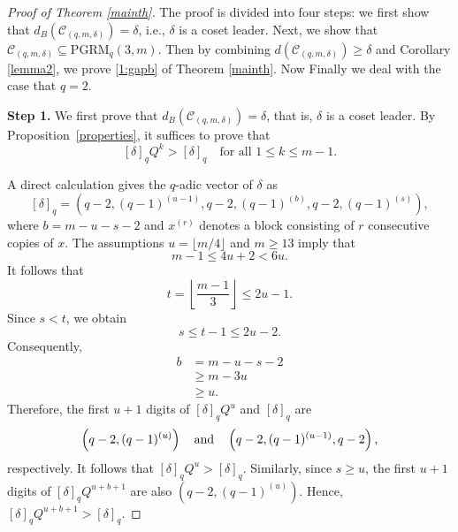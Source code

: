 \documentclass[journal,onecolumn]{IEEEtran}
\begin{document}
\begin{proof}[Proof of Theorem \ref{mainth}]
The proof is divided into four steps: we first show that $d_B(\mathcal{C}_{(q,m,\delta)})=\delta$, i.e., $\delta$ is a coset leader. Next, we show that $\mathcal{C}_{(q,m,\delta)} \subseteq
\mathrm{PGRM}_q(3,m)$. Then by combining $d(\mathcal{C}_{(q,m,\delta)}) \ge \delta$ and Corollary \ref{lemma2}, we prove \eqref{1:gapb} of Theorem \ref{mainth}. Now Finally we deal with the case that $q=2$. 

{\bf Step 1.} We first prove that $d_B(\mathcal{C}_{(q,m,\delta)})=\delta$, that is, $\delta$ is a coset leader.  
By Proposition~\ref{properties}, it suffices to prove that
\begin{equation}\label{suf}
[\delta]_qQ^k>[\delta]_q
\quad\text{for all }1\leq k\leq m-1.
\end{equation}

A direct calculation
gives the $q$-adic vector of $\delta$ as 
\begin{equation}\label{deltaq}
    [\delta]_q = \left( q-2, (q-1)^{(u-1)}, q-2, (q-1)^{(b)}, q-2, (q-1)^{(s)} \right),
\end{equation}
where $b = m - u - s - 2$ and $x^{(r)}$ denotes a block consisting of $r$ consecutive copies of
$x$.
The assumptions $u = \lfloor m/4 \rfloor$ and $m \ge 13$ imply that
\begin{equation*}
    m - 1 \le 4u + 2 < 6u.
\end{equation*}
It follows that
\begin{equation*}
    t = \left\lfloor \frac{m-1}{3} \right\rfloor \le 2u - 1.
\end{equation*}
Since $s < t$, we obtain
\begin{equation}\label{hao}
    s \le t - 1 \le 2u - 2.
\end{equation}
Consequently,
\begin{equation}\label{bgequ}
\begin{split}
    b &= m - u - s - 2 \\
    &\ge m - 3u\\ 
    &\ge u.
    \end{split}
\end{equation} 
Therefore, the first $u+1$ digits of $[\delta]_qQ^u$ and $[\delta]_q$
are
\begin{equation*}
    \left(q-2,(q-1)^{(u)}\right)\quad \hbox{and}\quad 
\left(q-2,(q-1)^{(u-1)},q-2\right), 
\end{equation*}
respectively. It follows that $[\delta]_q Q^{u} > [\delta]_q$. 
Similarly, since $s \ge u$, the first $u+1$ digits of
$[\delta]_q Q^{u+b+1}$ are also  $\left( q-2, (q-1)^{(u)} \right)$. Hence,
$
    [\delta]_q Q^{u+b+1} > [\delta]_q.
$ 



\end{proof}
\end{document}
